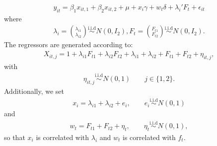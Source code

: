 \documentclass[a4paper,11pt,english]{sphinxmanual}
\begin{document}
\begin{fulllineitems}
\begin{description}
\end{description}
\begin{equation*}
\begin{split}y_{it} = \beta_{1}x_{it,1}+\beta_{2}x_{it,2}+ \mu+ x_{i}\gamma +w_{t}\delta +
\lambda_{i}'F_{t}+\epsilon_{it}\end{split}
\end{equation*}
\sphinxAtStartPar
where
\begin{equation*}
\begin{split}\lambda_i = \binom{\lambda_{i1}}{\lambda_{i2}} \stackrel{\text{i.i.d}}{\sim}
N(0,I_2),
F_t =\binom{F_{t1}}{F_{t2}}\stackrel{\text{i.i.d}}{\sim}N(0,I_2).\end{split}
\end{equation*}
\sphinxAtStartPar
The regressors are generated according to:
\begin{equation*}
\begin{split}X_{it,j}= 1+\lambda_{i1}F_{t1}+\lambda_{i2}F_{t2}+\lambda_{i1}+\lambda_{i2}+
F_{t1}+F_{t2}+\eta_{it,j},\end{split}
\end{equation*}
\sphinxAtStartPar
with
\begin{equation*}
\begin{split}\eta_{it,j}\stackrel{\text{i.i.d}}{\sim} N(0,1) \qquad j\in \{1,2\}.\end{split}
\end{equation*}
\sphinxAtStartPar
Additionally,  we set
\begin{equation*}
\begin{split}x_{i}=\lambda_{i1}+\lambda_{i2}+e_{i},
\qquad e_{i} \stackrel{\text{i.i.d}}{\sim} N(0,1)\end{split}
\end{equation*}
\sphinxAtStartPar
and
\begin{equation*}
\begin{split}w_{t}=F_{t1}+F_{t2}+\eta_{t},
\qquad \eta_{t} \stackrel{\text{i.i.d}}{\sim} N(0,1),\end{split}
\end{equation*}
\sphinxAtStartPar
so that \(x_{i}\) is correlated with \(\lambda_i\) and \(w_t\) is
correlated with \(f_t\).

\end{fulllineitems}

\end{document}
